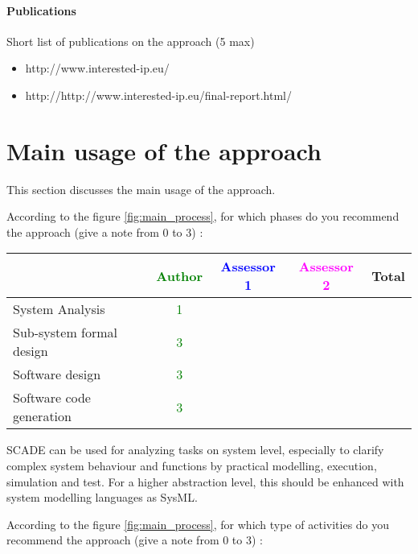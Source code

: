 \paragraph{Publications} Short list of publications on the approach (5 max)

\begin{itemize}
	\item http://www.interested-ip.eu/
  \item http://http://www.interested-ip.eu/final-report.html/

\end{itemize}

\section{Main usage of the approach}
\label{main_usage}
This section discusses the main usage of the approach.

According to the figure \ref{fig:main_process}, for which phases do you recommend the approach (give a note from 0 to  3) :

\begin{tabular}{|l | c | c | c | c|}
\hline
& \textcolor{green}{Author} & \textcolor{blue}{Assessor 1} & \textcolor{magenta}{Assessor 2} & Total \\
\hline 
System Analysis & \textcolor{green}{1}  & & &  \\
\hline
Sub-system  formal  design &  \textcolor{green}{3} & & & \\
\hline
Software design & \textcolor{green}{3}  & & & \\
\hline
Software code generation & \textcolor{green}{3} & & & \\
\hline
\end{tabular}

\begin{author_comment}
SCADE can be used for analyzing tasks on system level, especially to clarify complex system behaviour and functions by practical modelling, execution, simulation and test. For a higher abstraction level, this should be enhanced with system modelling languages as SysML.
\end{author_comment}
According to the figure \ref{fig:main_process}, for which type of activities do you recommend the approach (give a note from 0 to  3) :

